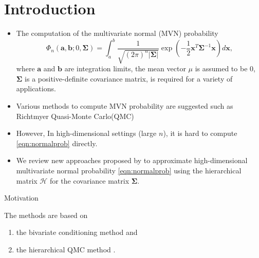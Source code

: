 \section{Introduction}

\begin{frame}{\secname}

    \begin{itemize}
        \item The computation of the multivariate normal (MVN) probability 
        \begin{equation}\label{eqn:normalprob}
            \Phi_n(\mathbf{a}, \mathbf{b}; 0, \boldsymbol{\Sigma}) = \int_a^b \frac{1}{\sqrt{(2\pi)^n |\boldsymbol{\Sigma}|}} \exp\left( -\frac{1}{2} \mathbf{x}^T \boldsymbol{\Sigma}^{-1} \mathbf{x} \right) d\mathbf{x},
        \end{equation}
        where $\mathbf{a}$ and $\mathbf{b}$ are integration limits, the mean vector $\mu$ is assumed to be 0, $\boldsymbol{\Sigma}$ is a positive-definite covariance matrix, is required for a variety of applications. 
        \item Various methods to compute MVN probability are suggested such as Richtmyer Quasi-Monte Carlo(QMC) \citep{genz2009computation}
        \item However, In high-dimensional settings (large $n$), it is hard to compute \eqref{eqn:normalprob} directly.
        \item We review new approaches proposed by \citet{cao2019hierarchical} to approximate high-dimensional multivariate normal probability \eqref{eqn:normalprob}
        using the hierarchical matrix $\mathcal{H}$ \citep{hackbusch2015hierarchical} for the covariance matrix $\boldsymbol{\Sigma}$. 
    \end{itemize}
    
\end{frame}

\begin{frame}{Motivation}
    
    The methods are based on 
        \begin{enumerate}
            \item the bivariate conditioning method \citep{trinh2015bivariate} and
            \item the hierarchical QMC method \citep{genton2018hierarchical}.
        \end{enumerate} 
\end{frame}